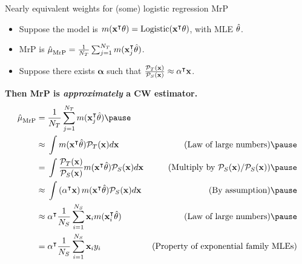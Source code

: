 \begin{frame}[t]{Nearly equivalent weights for (some) logistic regression MrP}

\def\alphav{\mathbf{\alpha}}
%
\begin{itemize}
    \item Suppose the model is $m(\mathbf{x}^\intercal \theta) = \mathrm{Logistic}(\mathbf{x}^\intercal \theta)$, with MLE $\hat{\theta}$.
    \item MrP is $\hat{\mu}^{}_{\mathrm{MrP}} = \frac{1}{{N_T}} \sum_{j=1}^{N_T} m(\mathbf{x}_j^\intercal \hat{\theta})$.
    \item Suppose there exists $\alphav$ such that
            $\frac{\ptar(\x)}{\psur(\x)} \approx \alphav^\trans \x$.
\end{itemize}
%

\textbf{Then MrP is \textit{approximately} a CW estimator.}\pause
$$
\begin{aligned}
\muhat_\mrp ={}& \meantar \m(\x_j^\trans \thetahat) \pause
\\ \approx{}&
    \int \m(\x^\trans \thetahat) \ptar(\x) d\x
    & \textrm{(Law of large numbers)} \pause
\\ ={}&
    \int \frac{\ptar(\x)}{\psur(\x)} \m(\x^\trans \thetahat) \psur(\x) d\x
    & \textrm{(Multiply by $\psur(\x) / \psur(\x)$)} \pause
\\ \approx{}&
    \int \left( \alphav^\trans \x\right) \m(\x^\trans \thetahat) \psur(\x) d\x
    & \textrm{(By assumption)} \pause
\\ \approx{}&
    \alphav^\trans \meansur \x_i \m(\x_i^\trans \thetahat)
    & \textrm{(Law of large numbers)}\pause
\\={}&
    \alphav^\trans \meansur \x_i \y_i
    & \textrm{(Property of exponential family MLEs)}
\end{aligned}
$$


\end{frame}



